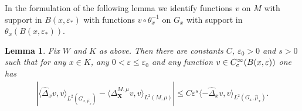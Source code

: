 \documentclass[JEP,XML,SOM,Unicode,published]{cedram}
\newcommand{\rc}{\textup{c}}
\newcommand{\bX}{{\boldsymbol{X}}}
\newtheorem{lemma}[theorem]{Lemma}
\theoremstyle{definition}
\let\epsilon\varepsilon
\let\Xb\bX
\newcommand{\1}{\mathbbm{1}}
\begin{document}
In the formulation of the following lemma we identify functions $v$ on $M$ with support in $B(x,\epsilon_*)$ with functions $v\circ\theta_x^{-1}$ on $G_{x}$ with support in $\theta_x(B(x,\epsilon_*))$.

\begin{lemma}\label{l:remainder2}
Fix $W$ and $K$ as above. Then there are constants $C$, $\epsilon_0>0$ and $s>0$ such that for any $x\in K$, any $0<\epsilon\leq\epsilon_0$ and any function $v\in C^\infty_\rc(B(x,\epsilon))$ one has
\begin{align*}
\left| \langle \widehat{\Delta}_{x} v, v \rangle_{L^2(G_{x,\widehat\mu_{x}})} - \langle \Delta_\Xb^{M,\mu} v, v \rangle_{L^2(M,\mu)}\right| \leq C \epsilon^s \langle - \widehat{\Delta}_{x} v, v \rangle_{L^2(G_{x},\widehat\mu_{x})}.
\end{align*}
\end{lemma}
\end{document}

